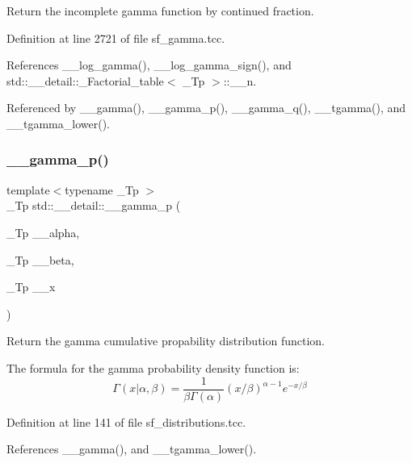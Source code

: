 Return the incomplete gamma function by continued fraction. 



Definition at line 2721 of file sf\+\_\+gamma.\+tcc.



References \+\_\+\+\_\+log\+\_\+gamma(), \+\_\+\+\_\+log\+\_\+gamma\+\_\+sign(), and std\+::\+\_\+\+\_\+detail\+::\+\_\+\+Factorial\+\_\+table$<$ \+\_\+\+Tp $>$\+::\+\_\+\+\_\+n.



Referenced by \+\_\+\+\_\+gamma(), \+\_\+\+\_\+gamma\+\_\+p(), \+\_\+\+\_\+gamma\+\_\+q(), \+\_\+\+\_\+tgamma(), and \+\_\+\+\_\+tgamma\+\_\+lower().

\mbox{\label{namespacestd_1_1____detail_a33f9cf005ecdad199024712cc89c0bc6}} 
\subsubsection{\texorpdfstring{\+\_\+\+\_\+gamma\+\_\+p()}{\_\_gamma\_p()}\hspace{0.1cm}{\footnotesize\ttfamily [1/2]}}
{\footnotesize\ttfamily template$<$typename \+\_\+\+Tp $>$ \\
\+\_\+\+Tp std\+::\+\_\+\+\_\+detail\+::\+\_\+\+\_\+gamma\+\_\+p (\begin{DoxyParamCaption}\item[{\+\_\+\+Tp}]{\+\_\+\+\_\+alpha,  }\item[{\+\_\+\+Tp}]{\+\_\+\+\_\+beta,  }\item[{\+\_\+\+Tp}]{\+\_\+\+\_\+x }\end{DoxyParamCaption})}



Return the gamma cumulative propability distribution function. 

The formula for the gamma probability density function is\+: \[ \Gamma(x|\alpha,\beta) = \frac{1}{\beta\Gamma(\alpha)} (x/\beta)^{\alpha - 1} e^{-x/\beta} \] 

Definition at line 141 of file sf\+\_\+distributions.\+tcc.



References \+\_\+\+\_\+gamma(), and \+\_\+\+\_\+tgamma\+\_\+lower().



